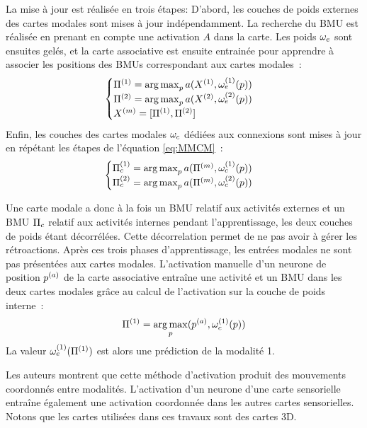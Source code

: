 \documentclass[../main]{subfiles}
\begin{document}
La mise à jour est réalisée en trois étapes: 
D'abord, les couches de poids externes des cartes modales sont mises à jour indépendamment.
La recherche du BMU est réalisée en prenant en compte une activation $A$ dans la carte.
Les poids $\omega_e$ sont ensuites gelés, et la carte associative est ensuite entrainée pour apprendre à associer les positions des BMUs correspondant aux cartes modales~: 
\begin{equation}\label{eq:MMCM}
\begin{cases}
    \Pi^{({1})} = \operatorname*{arg\,max}_p a(X^{({1})}, \omega_e^{({1})}(p))\\
    \Pi^{({2})} = \operatorname*{arg\,max}_p a(X^{({2})}, \omega_e^{({2})}(p))\\
    X^{({m})} = [\Pi^{({1})}, \Pi^{({2})}]\\
\end{cases}
\end{equation}
Enfin, les couches des cartes modales $\omega_c$ dédiées aux connexions sont mises à jour en répétant les étapes de l'équation \ref{eq:MMCM}~:
\begin{equation}\label{eq:MMCM}
    \begin{cases}
        \Pi_c^{({1})} = \operatorname*{arg\,max}_p a(\Pi^{({m})}, \omega_c^{({1})}(p))\\
        \Pi_c^{({2})} = \operatorname*{arg\,max}_p a(\Pi^{({m})}, \omega_c^{({2})}(p))
    \end{cases}
    \end{equation}

Une carte modale a donc à la fois un BMU relatif aux activités externes et un BMU $\Pi_c$ relatif aux activités internes pendant l'apprentissage, les deux couches de poids étant décorrélées.
Cette décorrelation permet de ne pas avoir à gérer les rétroactions.
Après ces trois phases d'apprentissage, les entrées modales ne sont pas présentées aux cartes modales. L'activation manuelle d'un neurone de position $p^{({a})}$ de la carte associative entraîne une activité et un BMU dans les deux cartes modales grâce au calcul de l'activation sur la couche de poids interne~: 
$$ \Pi^{({1})} = \operatorname*{arg\,max}_p(p^{({a})},\omega_c^{({1})}(p))$$
La valeur $\omega_e^{({1})}(\Pi^{({1})})$ est alors une prédiction de la modalité 1.

Les auteurs montrent que cette méthode d'activation produit des mouvements coordonnés entre modalités.
L'activation d'un neurone d'une carte sensorielle entraîne également une activation coordonnée dans les autres cartes sensorielles. 
Notons que les cartes utilisées dans ces travaux sont des cartes 3D.
\end{document}
